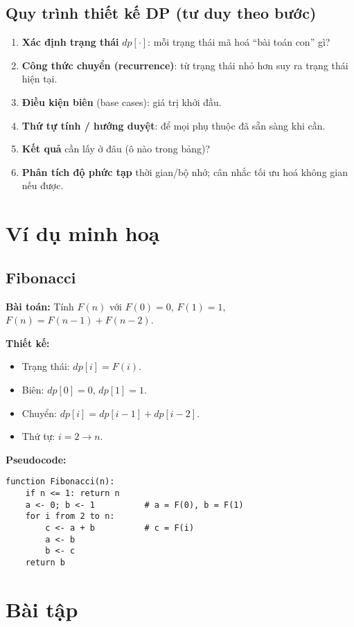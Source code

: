\subsection*{Quy trình thiết kế DP (tư duy theo bước)}
\begin{enumerate}[label=\textbf{Bước \arabic*.},leftmargin=*,itemsep=2pt]
  \item \textbf{Xác định trạng thái} $dp[\cdot]$: mỗi trạng thái mã hoá “bài toán con” gì?
  \item \textbf{Công thức chuyển (recurrence)}: từ trạng thái nhỏ hơn suy ra trạng thái hiện tại.
  \item \textbf{Điều kiện biên} (base cases): giá trị khởi đầu.
  \item \textbf{Thứ tự tính / hướng duyệt}: để mọi phụ thuộc đã sẵn sàng khi cần.
  \item \textbf{Kết quả} cần lấy ở đâu (ô nào trong bảng)?
  \item \textbf{Phân tích độ phức tạp} thời gian/bộ nhớ; cân nhắc tối ưu hoá không gian nếu được.
\end{enumerate}

\section{Ví dụ minh hoạ}
\subsection{Fibonacci}
\textbf{Bài toán:} Tính $F(n)$ với $F(0)=0$, $F(1)=1$, $F(n)=F(n-1)+F(n-2)$.\par
\textbf{Thiết kế:}
\begin{itemize}[noitemsep]
  \item Trạng thái: $dp[i]=F(i)$.
  \item Biên: $dp[0]=0$, $dp[1]=1$.
  \item Chuyển: $dp[i]=dp[i-1]+dp[i-2]$.
  \item Thứ tự: $i=2\to n$.
\end{itemize}

\noindent\textbf{Pseudocode:}
\begin{lstlisting}
function Fibonacci(n):
    if n <= 1: return n
    a <- 0; b <- 1          # a = F(0), b = F(1)
    for i from 2 to n:
        c <- a + b          # c = F(i)
        a <- b
        b <- c
    return b
\end{lstlisting}

\section{Bài tập}

